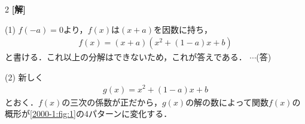 \documentclass[../../main.tex]{subfiles}
\begin{document}
\setcounter{equation}{0}
\setcounter{figure}{0}
\setcounter{table}{0}
\begin{oframed}
  
\end{oframed}
\setlength{\columnseprule}{0.4pt}
\begin{multicols}{2}
  {\bf[解]}

  (1)
  $f(-a)=0$より，$f(x)$は$(x+a)$を因数に持ち，
  \begin{align*}
    f(x)=(x+a)(x^2+(1-a)x+b)
  \end{align*}
  と書ける．これ以上の分解はできないため，これが答えである．  $\cdots$(答)

  \vspace{10pt}
  (2)
  新しく
  \begin{align*}
    g(x) = x^2+(1-a)x+b
  \end{align*}
  とおく．$f(x)$の三次の係数が正だから，$g(x)$の解の数によって関数$f(x)$の概形が\cref{2000-1:fig:1}の4パターンに変化する．


\end{multicols}
\end{document}
